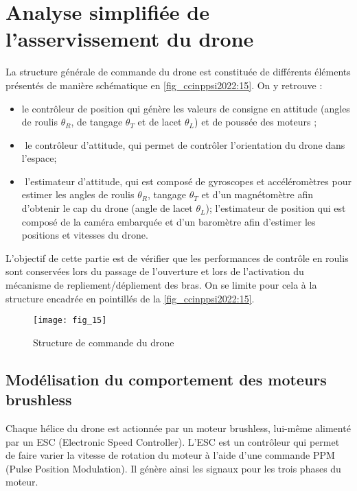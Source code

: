 
\section{\label{sec:03} Analyse simplifiée de l’asservissement du drone}
\ifprof
\else
La structure générale de commande du drone est constituée de différents éléments présentés de manière schématique en \autoref{fig_ccinppsi2022:15}. On y retrouve :
\begin{itemize}
\item le contrôleur de position qui génère les valeurs de consigne en attitude 
(angles de roulis $\theta_R$, 
de tangage $\theta_T$ 
et de lacet $\theta_L$)
et de poussée des moteurs ;
\item­ le contrôleur d’attitude, qui permet de contrôler l’orientation du drone dans l’espace;
\item­ l’estimateur d’attitude, qui est composé de gyroscopes et accéléromètres pour estimer
les angles de roulis $\theta_R$, tangage $\theta_T$ et d’un magnétomètre afin d’obtenir le cap du drone
(angle de lacet $\theta_L$);
­ l’estimateur de position qui est composé de la caméra embarquée et d’un baromètre
afin d’estimer les positions et vitesses du drone.
\end{itemize}

\fi

\begin{obj}
L’objectif de cette partie est de vérifier que les performances de contrôle en roulis sont
conservées lors du passage de l’ouverture et lors de l’activation du mécanisme de repliement/dépliement des bras. On se limite pour cela à la structure encadrée en pointillés de la
\autoref{fig_ccinppsi2022:15}.
\end{obj}

\ifprof
\else
\begin{figure}[H]
\centering
\texttt{[image: fig\_15]}
\caption{\label{fig_ccinppsi2022:15} Structure de commande du drone}
\end{figure}
\fi

\subsection{­Modélisation du comportement des moteurs brushless}
\ifprof
\else
Chaque hélice du drone est actionnée par un moteur brushless, lui-même alimenté par un
ESC (Electronic Speed Controller). L’ESC est un contrôleur qui permet de faire varier la
vitesse de rotation du moteur à l’aide d’une commande PPM (Pulse Position Modulation). Il
génère ainsi les signaux pour les trois phases du moteur.

